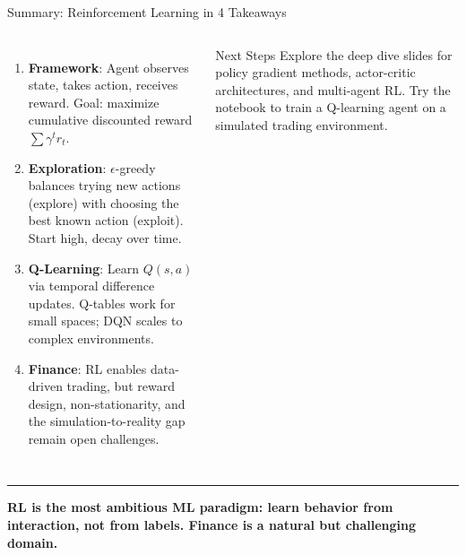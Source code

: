 \documentclass[8pt,aspectratio=169]{beamer}
\newcommand{\bottomnote}[1]{%
\vfill
\vspace{-2mm}
\textcolor{mllavender2}{\rule{\textwidth}{0.4pt}}
\vspace{1mm}
\footnotesize
\textbf{#1}
}
\newcommand{\highlight}[1]{\textcolor{mlorange}{\textbf{#1}}}
\begin{document}
\begin{frame}[t]{Summary: Reinforcement Learning in 4 Takeaways}
\begin{columns}[T]
\small
\begin{enumerate}
\setlength{\itemsep}{6pt}
\item \highlight{Framework}: Agent observes state, takes action, receives reward. Goal: maximize cumulative discounted reward $\sum \gamma^t r_t$.
\item \highlight{Exploration}: $\epsilon$-greedy balances trying new actions (explore) with choosing the best known action (exploit). Start high, decay over time.
\item \highlight{Q-Learning}: Learn $Q(s,a)$ via temporal difference updates. Q-tables work for small spaces; DQN scales to complex environments.
\item \highlight{Finance}: RL enables data-driven trading, but reward design, non-stationarity, and the simulation-to-reality gap remain open challenges.
\end{enumerate}

\vspace{4mm}
\begin{block}{Next Steps}
\scriptsize Explore the deep dive slides for policy gradient methods, actor-critic architectures, and multi-agent RL. Try the notebook to train a Q-learning agent on a simulated trading environment.
\end{block}
\end{columns}

\bottomnote{RL is the most ambitious ML paradigm: learn behavior from interaction, not from labels. Finance is a natural but challenging domain.}
\end{frame}
\end{document}

